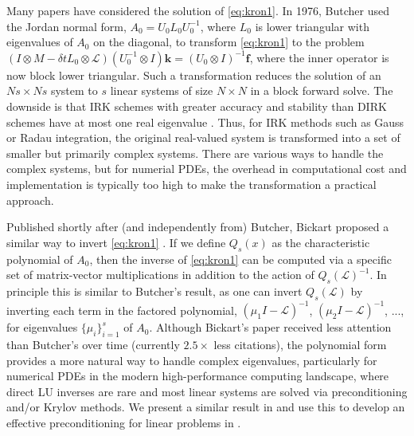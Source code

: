 \documentclass[review]{siamart}
\makeatletter
\newcommand{\todo}[1]{\textcolor{red}{[TODO\@: #1]}}
\makeatother
\begin{document}

Many papers have considered the solution of \eqref{eq:kron1}. In 1976,
Butcher \cite{butcher76} used the Jordan normal form, $A_0 = U_0L_0U_0^{-1}$, where
$L_0$ is lower triangular with eigenvalues of $A_0$ on the diagonal, to transform
\eqref{eq:kron1} to the problem
$(I\otimes M - \delta t L_0\otimes \mathcal{L})(U_0^{-1}\otimes I)\mathbf{k} =
(U_0\otimes I)^{-1}\mathbf{f}$, where the inner operator is now block lower triangular.
Such a transformation reduces the solution of an $Ns\times Ns$ system to $s$ linear
systems of size $N\times N$ in a block forward solve. The downside is that
IRK schemes with greater accuracy and stability than DIRK schemes have at most one real
eigenvalue \cite{hairer96,butcher2016numerical}.
Thus, for IRK methods such as Gauss or Radau integration, the original real-valued
system is transformed into a set of smaller but primarily complex systems. There are various
ways to handle the complex systems,
but for numerial PDEs, the overhead in computational cost and implementation is typically
too high to make the transformation a practical approach.  

Published shortly after (and independently from) Butcher, Bickart proposed a similar
way to invert \eqref{eq:kron1} \cite{bickart77}. If we define $Q_s(x)$ as
the characteristic polynomial of $A_0$, then the inverse of \eqref{eq:kron1} can be computed
via a specific set of matrix-vector multiplications in addition to the action of
$Q_s(\mathcal{L})^{-1}$.
In principle this is similar to Butcher's result, as one can invert
$Q_s(\mathcal{L})$ by inverting 
each term in the factored polynomial, $(\mu_1 I-\mathcal{L})^{-1}$,
$(\mu_2 I-\mathcal{L})^{-1}$, ..., for eigenvalues $\{\mu_i\}_{i=1}^s$ of $A_0$.
Although Bickart's paper received less attention than Butcher's over time (currently $2.5\times$
less citations), the polynomial form provides a more natural way to handle complex eigenvalues,
particularly for numerical PDEs in the modern high-performance computing landscape,
where direct LU inverses are rare and most linear systems are solved via preconditioning
and/or Krylov methods. We present a similar result in  and use this to
develop an effective preconditioning for linear problems in .
\end{document}
